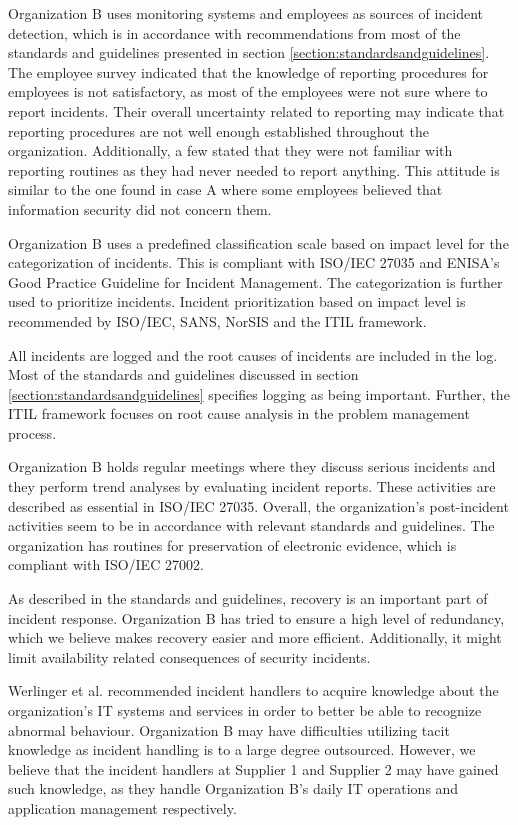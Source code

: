 Organization B uses monitoring systems and employees as sources of incident detection, which is in accordance with recommendations from most of the standards and guidelines presented in section \ref{section:standardsandguidelines}. The employee survey indicated that the knowledge of reporting procedures for employees is not satisfactory, as most of the employees were not sure where to report incidents. Their overall uncertainty related to reporting may indicate that reporting procedures are not well enough established throughout the organization. Additionally, a few stated that they were not familiar with reporting routines as they had never needed to report anything. This attitude is similar to the one found in case A where some employees believed that information security did not concern them. 

Organization B uses a predefined classification scale based on impact level for the categorization of incidents. This is compliant with ISO/IEC 27035 and ENISA's Good Practice Guideline for Incident Management. The categorization is further used to prioritize incidents. Incident prioritization based on impact level is recommended by ISO/IEC, SANS, NorSIS and the ITIL framework.

All incidents are logged and the root causes of incidents are included in the log. Most of the standards and guidelines discussed in section \ref{section:standardsandguidelines} specifies logging as being important. Further, the ITIL framework focuses on root cause analysis in the problem management process.

Organization B holds regular meetings where they discuss serious incidents and they perform trend analyses by evaluating incident reports. These activities are described as essential in ISO/IEC 27035. Overall, the organization's post-incident activities seem to be in accordance with relevant standards and guidelines. The organization has routines for preservation of electronic evidence, which is compliant with ISO/IEC 27002.

As described in the standards and guidelines, recovery is an important part of incident response. Organization B has tried to ensure a high level of redundancy, which we believe makes recovery easier and more efficient. Additionally, it might limit availability related consequences of security incidents. 

Werlinger et al. recommended incident handlers to acquire knowledge about the organization's IT systems and services in order to better be able to recognize abnormal behaviour\cite{werlinger2010preparation}. Organization B may have difficulties utilizing tacit knowledge as incident handling is to a large degree outsourced. However, we believe that the incident handlers at Supplier 1 and Supplier 2 may have gained such knowledge, as they handle Organization B's daily IT operations and application management respectively. 

